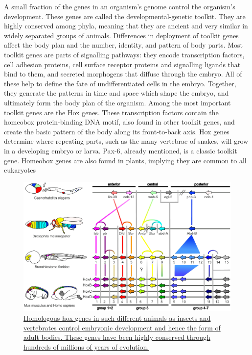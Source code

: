 A small fraction of the genes in an organism's genome control the organism's development. These genes are called the developmental-genetic toolkit. They are highly conserved among phyla, meaning that they are ancient and very similar in widely separated groups of animals. Differences in deployment of toolkit genes affect the body plan and the number, identity, and pattern of body parts. Most toolkit genes are parts of signalling pathways: they encode transcription factors, cell adhesion proteins, cell surface receptor proteins and signalling ligands that bind to them, and secreted morphogens that diffuse through the embryo. All of these help to define the fate of undifferentiated cells in the embryo. Together, they generate the patterns in time and space which shape the embryo, and ultimately form the body plan of the organism. Among the most important toolkit genes are the Hox genes. These transcription factors contain the homeobox protein-binding DNA motif, also found in other toolkit genes, and create the basic pattern of the body along its front-to-back axis. Hox genes determine where repeating parts, such as the many vertebrae of snakes, will grow in a developing embryo or larva. Pax-6, already mentioned, is a classic toolkit gene. Homeobox genes are also found in plants, implying they are common to all eukaryotes



\begin{figure}

{\centering \includegraphics[width=0.7\linewidth]{./figures/development/Genes_hox} 

}

\caption{\href{https://commons.wikimedia.org/wiki/File:Genes_hox.jpeg}{Homologous hox genes in such different animals as insects and vertebrates control embryonic development and hence the form of adult bodies. These genes have been highly conserved through hundreds of millions of years of evolution.}}\label{fig:hoxgenes}
\end{figure}

